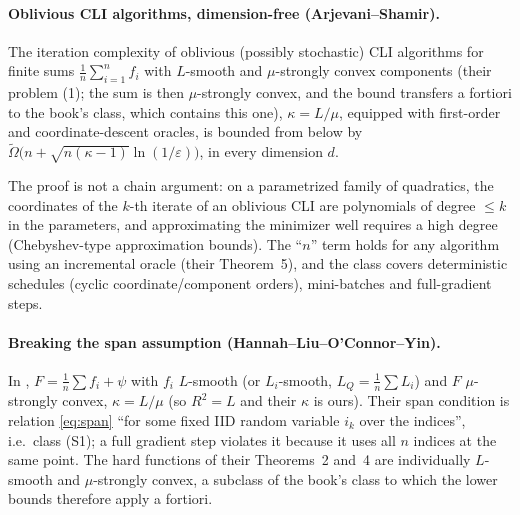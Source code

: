 \paragraph{Oblivious CLI algorithms, dimension-free (Arjevani--Shamir).}

\begin{theorem}
\label{thm:AS}
The iteration complexity of oblivious (possibly stochastic) CLI algorithms for finite sums $\frac1n\sum_{i=1}^nf_i$ with $L$-smooth and $\mu$-strongly convex components (their problem (1); the sum is then $\mu$-strongly convex, and the bound transfers a fortiori to the book's class, which contains this one), $\kappa=L/\mu$, equipped with first-order and coordinate-descent oracles, is bounded from below by $\tilde\Omega\big(n+\sqrt{n(\kappa-1)}\ln(1/\varepsilon)\big)$, in every dimension $d$.
\end{theorem}

The proof is not a chain argument: on a parametrized family of quadratics, the coordinates of the $k$-th iterate of an oblivious CLI are polynomials of degree $\le k$ in the parameters, and approximating the minimizer well requires a high degree (Chebyshev-type approximation bounds). The ``$n$'' term holds for any algorithm using an incremental oracle (their Theorem~5), and the class covers deterministic schedules (cyclic coordinate/component orders), mini-batches and full-gradient steps.

\paragraph{Breaking the span assumption (Hannah--Liu--O'Connor--Yin).}
In \cite{hannah2018breaking}, $F=\frac1n\sum f_i+\psi$ with $f_i$ $L$-smooth (or $L_i$-smooth, $L_Q=\frac1n\sum L_i$) and $F$ $\mu$-strongly convex, $\kappa=L/\mu$ (so $R^2=L$ and their $\kappa$ is ours). Their span condition is relation \eqref{eq:span} ``for some fixed IID random variable $i_k$ over the indices'', i.e.\ class (S1); a full gradient step violates it because it uses all $n$ indices at the same point. The hard functions of their Theorems~2 and~4 are individually $L$-smooth and $\mu$-strongly convex, a subclass of the book's class to which the lower bounds therefore apply a fortiori.

